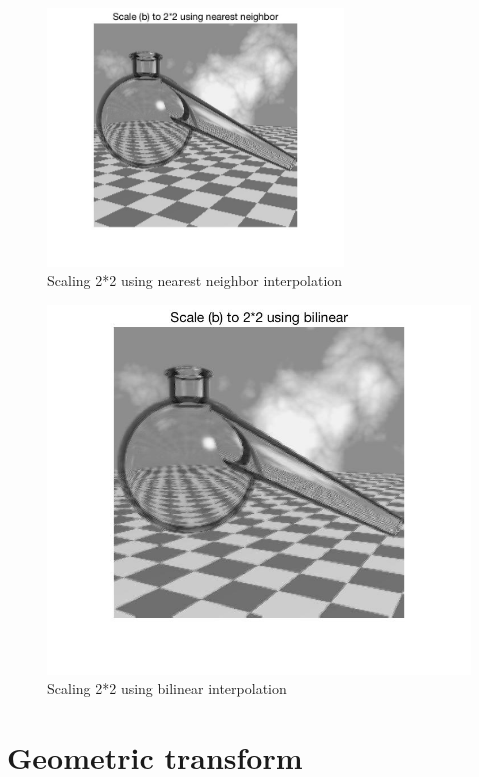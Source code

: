 \documentclass[11pt,oneside]{book}
\begin{document}
\begin{figure}[!htb]
   \centering  
   \includegraphics[width=0.7\textwidth]{images/6/scale_nn.jpg}
   \caption{Scaling 2*2 using nearest neighbor interpolation}
\end{figure}
\begin{figure}[!htb]
   \centering  
   \includegraphics[width=1\textwidth]{images/6/scale_b.jpg}
   \caption{Scaling 2*2 using bilinear interpolation}
\end{figure}

\newpage

\chapter{Geometric transform}
\end{document}
